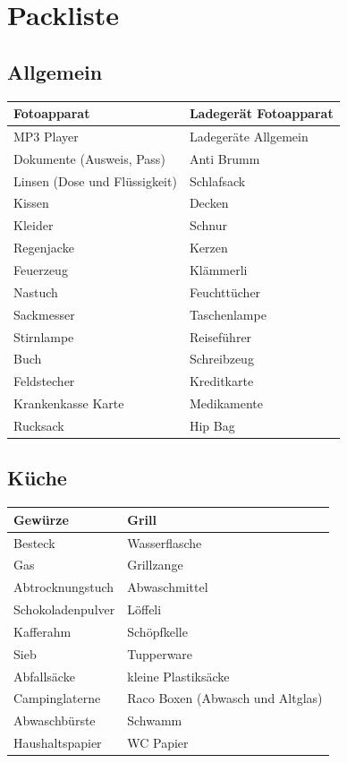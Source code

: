\section{Packliste}
\subsection{Allgemein}
\begin{center}
\begin{tabular}{|p{5cm}|p{5cm}|}\hline
Fotoapparat & Ladegerät Fotoapparat \\ \hline
MP3 Player & Ladegeräte Allgemein \\ \hline
Dokumente (Ausweis, Pass) & Anti Brumm \\ \hline
Linsen (Dose und Flüssigkeit) & Schlafsack \\ \hline
Kissen & Decken \\ \hline
Kleider & Schnur \\ \hline
Regenjacke & Kerzen \\ \hline
Feuerzeug & Klämmerli \\ \hline
Nastuch & Feuchttücher \\ \hline
Sackmesser & Taschenlampe \\ \hline
Stirnlampe & Reiseführer \\ \hline
Buch & Schreibzeug \\ \hline
Feldstecher & Kreditkarte \\ \hline
Krankenkasse Karte & Medikamente \\ \hline
Rucksack & Hip Bag \\ \hline
\end{tabular}
\end{center}
\newpage
 
\subsection{Küche}
\begin{center}
\begin{tabular}{|p{5cm}|p{5cm}|}\hline
Gewürze & Grill \\ \hline
Besteck & Wasserflasche \\ \hline
Gas & Grillzange  \\ \hline
Abtrocknungstuch & Abwaschmittel \\ \hline
Schokoladenpulver & Löffeli \\ \hline
Kafferahm & Schöpfkelle \\ \hline
Sieb & Tupperware \\ \hline
Abfallsäcke & kleine Plastiksäcke \\ \hline
Campinglaterne & Raco Boxen (Abwasch und Altglas) \\ \hline
Abwaschbürste & Schwamm \\ \hline
Haushaltspapier & WC Papier \\ \hline
\end{tabular}
\end{center}
\newpage

